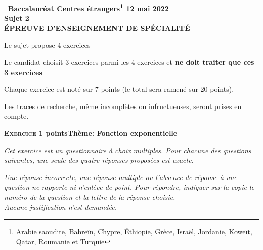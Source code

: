 \documentclass[11pt,a4paper,french]{article}
\begin{document}
\setlength\parindent{0mm}
\pagestyle{fancy}
\thispagestyle{empty}

\begin{center}{\Large\textbf{\decofourleft~Baccalauréat Centres étrangers\footnote{Arabie saoudite, Bahreïn, Chypre, Éthiopie, Grèce, Israël, Jordanie, Koweït, Qatar, Roumanie et Turquie} 12 mai 2022~\decofourright\\[7pt]  Sujet 2\\[7pt] ÉPREUVE D'ENSEIGNEMENT DE SPÉCIALITÉ}}
\end{center}

\vspace{0,25cm}

Le sujet propose 4 exercices

Le candidat choisit 3 exercices parmi les 4 exercices et \textbf{ne doit traiter que ces 3 exercices}

Chaque exercice est noté sur 7 points (le total sera ramené sur 20 points).

Les traces de recherche, même incomplètes ou infructueuses, seront prises en compte.

\bigskip

\textbf{\textsc{Exercice 1}  points\hfill Thème: Fonction exponentielle }

\medskip

\emph{Cet exercice est un questionnaire à choix multiples. Pour chacune des questions suivantes, une seule des quatre réponses proposées est exacte.}

\medskip

\emph{Une réponse incorrecte, une réponse multiple ou l'absence de réponse à une question ne rapporte ni n'enlève de point. Pour répondre, indiquer sur la copie le numéro de la question et la lettre de la réponse choisie.\\
Aucune justification n'est demandée.}

\medskip
\end{document}
